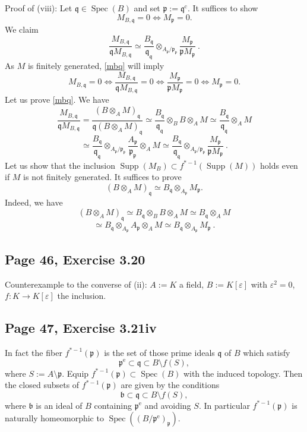 \documentclass[parskip=half,fontsize=12pt]{scrartcl}%
\newcommand{\oo}{\operatorname}\newcommand{\ooo}{\operatorname*}
\newcommand{\mf}{\mathfrak}
\newcommand{\bbb}{\mf b}
\newcommand{\ppp}{\mf p}
\newcommand{\qqq}{\mf q}
\newcommand{\Spec}{\operatorname{Spec}}\newcommand{\Sp}{\operatorname{Spec}}
\begin{document}
Proof of (viii): Let $\qqq\in\Spec(B)$ and set $\ppp:=\qqq^{\oo c}$. It suffices to show 
$$
M_{B,\qqq}=0\iff M_\ppp=0.
$$ 
We claim
\begin{equation}\label{mbq}
\frac{M_{B,\qqq}}{\qqq M_{B,\qqq}}\simeq\frac{B_\qqq}{\qqq_\qqq}\otimes_{A_\ppp/\ppp_\ppp}\frac{M_\ppp}{\ppp M_\ppp}\ .
\end{equation}
As $M$ is finitely generated, \eqref{mbq} will imply 
$$
M_{B,\qqq}=0\iff\frac{M_{B,\qqq}}{\qqq M_{B,\qqq}}=0\iff\frac{M_\ppp}{\ppp M_\ppp}=0\iff M_\ppp=0.
$$ 
Let us prove \eqref{mbq}. We have 
$$
\frac{M_{B,\qqq}}{\qqq M_{B,\qqq}}=
\frac{(B\otimes_AM)_\qqq}{\qqq(B\otimes_AM)_\qqq}\simeq
\frac{B_\qqq}{\qqq_\qqq}\otimes_BB\otimes_AM\simeq
\frac{B_\qqq}{\qqq_\qqq}\otimes_AM
$$ 
$$
\simeq
\frac{B_\qqq}{\qqq_\qqq}\otimes_{A_\ppp/\ppp_\ppp}\frac{A_\ppp}{\ppp_\ppp}\otimes_AM\simeq
\frac{B_\qqq}{\qqq_\qqq}\otimes_{A_\ppp/\ppp_\ppp}\frac{M_\ppp}{\ppp M_\ppp}\ .
$$ 
Let us show that the inclusion $\oo{Supp}(M_B)\subset f^{*-1}(\oo{Supp}(M))$ holds even if $M$ is not finitely generated. It suffices to prove 
$$%
(B\otimes_AM)_\qqq\simeq B_\qqq\otimes_{A_\ppp}M_\ppp.
$$%
Indeed, we have 
$$
(B\otimes_AM)_\qqq\simeq B_\qqq\otimes_BB\otimes_AM\simeq
B_\qqq\otimes_AM
$$ 
$$
\simeq B_\qqq\otimes_{A_\ppp}A_\ppp\otimes_AM
\simeq B_\qqq\otimes_{A_\ppp}M_\ppp\ .
$$

\subsection{Page 46, Exercise 3.20}%

Counterexample to the converse of (ii): $A:=K$ a field, $B:=K[\varepsilon]$ with $\varepsilon^2=0$, $f:K\to K[\varepsilon]$ the inclusion.%

\subsection{Page 47, Exercise 3.21iv}\label{321iv}%

In fact the fiber $f^{*-1}(\ppp)$ is the set of those prime ideals $\qqq$ of $B$ which satisfy 
$$
\ppp^{\oo{e}}\subset\qqq\subset B\setminus f(S),
$$ 
where $S:=A\setminus\ppp$. Equip $f^{*-1}(\ppp)\subset\Spec(B)$ with the induced topology. Then the closed subsets of $f^{*-1}(\ppp)$ are given by the conditions 
$$
\bbb\subset\qqq\subset B\setminus f(S),
$$ 
where $\bbb$ is an ideal of $B$ containing $\ppp^{\oo{e}}$ and avoiding $S$. In particular $f^{*-1}(\ppp)$ is naturally homeomorphic to $\Spec((B/\ppp^{\oo{e}})_\ppp)$.
\end{document}
